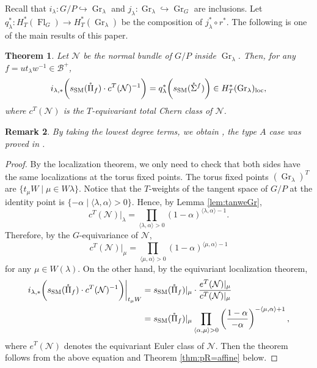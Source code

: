 \documentclass[12pt]{amsart}
\newtheorem{Th}{Theorem}[section]
\newtheorem{Rmk}[Th]{Remark}
\def\SSM{s_{\rm SM}}
\def\Gr{\operatorname{Gr}}
\def\Gr{\operatorname{Gr}}
\def\Fl{\operatorname{Fl}}
\def\loc{\operatorname{loc}}
\begin{document}
Recall that $i_\lambda:G/P\hookrightarrow\Gr_\lambda$ and $j_\lambda:\Gr_\lambda\hookrightarrow \Gr_G$ are inclusions. 
Let $q_\lambda^*:H_T^*(\Fl_G)\rightarrow H_T^*(\Gr_\lambda)$ be the composition of $j_\lambda^*\circ r^*$. 
The following is one of the main results of this paper.
\begin{Th}\label{thm:pR=aff}
Let $\mathcal{N}$ be the normal bundle of $G/P$ inside $\Gr_\lambda$. Then, for any $f=ut_{\lambda}w^{-1}\in \mathcal{B}^+$,  
$$i_{\lambda,*}\bigg(\SSM(\mathring{\Pi}_f)\cdot c^T(\mathcal{N})^{-1}\bigg)
= q_\lambda^*\bigg(\SSM(\mathring{\Sigma}^{f})\bigg)
\in H_T^*(\Gr_\lambda)_{\loc},
$$
where $c^T(\mathcal{N})$ is the $T$-equivariant total Chern class of $\mathcal{N}$.
\end{Th}

\begin{Rmk}
By taking the lowest degree terms, we obtain \cite[Theorem 5.8]{HL15}, the type $A$ case was  proved in \cite[Theorem 7.8]{KLS-Posi}.
\end{Rmk}

\begin{proof}
    By the localization theorem, we only need to check that both sides have the same localizations at the torus fixed points. The torus fixed points $(\Gr_\lambda)^T$ are $\{t_\mu W\mid \mu\in W\lambda\}$. Notice that the $T$-weights of the tangent space of $G/P$ at the identity point is $\{-\alpha\mid \langle\lambda,\alpha\rangle>0\}$. Hence, by Lemma \ref{lem:tanweGr}, 
    \[c^T(\mathcal{N})|_{\lambda }=\prod_{\langle\lambda,\alpha\rangle>0}(1-\alpha)^{\langle\lambda,\alpha\rangle-1}.\]
    Therefore, by the $G$-equivariance of $\mathcal{N}$,
    \[c^T(\mathcal{N})|_{\mu }=\prod_{\langle\mu,\alpha\rangle>0}(1-\alpha)^{\langle\mu,\alpha\rangle-1}\]
    for any $\mu\in W(\lambda)$.
    On the other hand, by the equivariant localization theorem,
    \begin{align*}
    i_{\lambda,*}\bigg(\SSM(\mathring{\Pi}_f)\cdot c^T(\mathcal{N})^{-1}\bigg)\bigg|_{t_\mu W}&=\SSM(\mathring{\Pi}_f)|_\mu  \cdot \frac{e^T(\mathcal{N})|_\mu}{c^T(\mathcal{N})|_\mu}\\
    &=\SSM(\mathring{\Pi}_f)|_\mu \prod_{\langle\alpha,\mu\rangle>0}\left(\frac{1-\alpha}{-\alpha}\right)^{-\langle \mu,\alpha \rangle+1},
    \end{align*}
    where $e^T(\mathcal{N})$ denotes the equivariant Euler class of $\mathcal{N}$.
    Then the theorem follows from the above equation and Theorem \ref{thm:pR=affine} below.
\end{proof}
\end{document}
